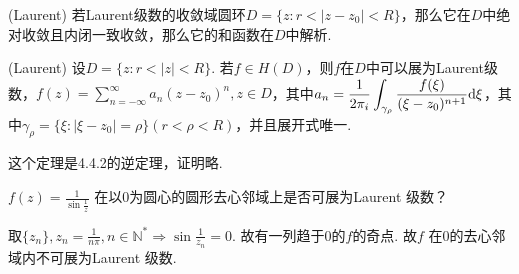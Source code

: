 \begin{theorem}
	\color{blue}
	({\rm Laurent})
	\color{black}
	若{\rm Laurent}级数的收敛域圆环$\displaystyle{D = \{z: r< \vert z - z_0 \vert < R \}}$，那么它在$\displaystyle{D}$中绝对收敛且内闭一致收敛，那么它的和函数在$\displaystyle{D}$中解析.
\end{theorem}

\begin{theorem}
	\color{blue}
	({\rm Laurent})
	\color{black}
	设$\displaystyle{D=\{z : r < \vert z \vert < R\}}$. 若$\displaystyle{f \in H(D)}$，则$\displaystyle{f}$在$\displaystyle{D }$中可以展为{\rm Laurent}级数，$\displaystyle{f(z)=\sum_{n = -\infty}^{\infty} a_n(z - z_0)^n}, z \in D$，其中$\displaystyle{a_n = \frac{1}{2\pi_i}  \int_{\gamma_\rho} \frac{f(\xi)} {(\xi - z_0)^{n+1}} \mathrm{d}\xi }$，其中$\displaystyle{\gamma_\rho = \{ \xi : \vert \xi - z_0 \vert  = \rho \} (r < \rho < R)}$，并且展开式唯一.
	
	这个定理是4.4.2的逆定理，证明略.
\end{theorem}


\begin{eg}
	\color{blue}
	$\displaystyle{f(z) = \frac{1}{\sin \frac{1}{z}}}$ 在以0为圆心的圆形去心邻域上是否可展为{\rm Laurent } 级数？
	\color{black}
\end{eg}
\begin{jie}
	
	取$\displaystyle{\{z_n\}, z_n = \frac{1}{n\pi}, n \in \mathbb{N} ^* \Rightarrow \sin \frac{1}{z_n} = 0}$. 故有一列趋于0的$\displaystyle{f}$的奇点. 故$\displaystyle{f}$ 在0的去心邻域内不可展为{\rm Laurent } 级数.
\end{jie}

